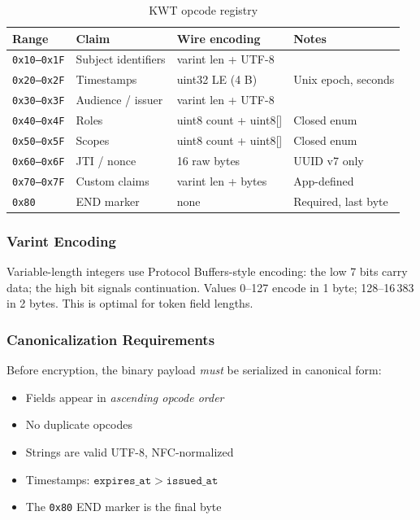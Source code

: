 \documentclass[11pt, letterpaper]{article}
\begin{document}
\begin{table}[H]
\centering
\caption{KWT opcode registry}
\small
\begin{tabularx}{\linewidth}{C{2.2cm} L{2.6cm} L{2.8cm} X}
\toprule
{}
\color{white}\textbf{Range} &
\color{white}\textbf{Claim} &
\color{white}\textbf{Wire encoding} &
\color{white}\textbf{Notes} \\
\midrule
\texttt{0x10--0x1F} & Subject identifiers & varint len + UTF-8 & \\
\texttt{0x20--0x2F} & Timestamps & uint32 LE (4 B) & Unix epoch, seconds \\
\texttt{0x30--0x3F} & Audience / issuer & varint len + UTF-8 & \\
\texttt{0x40--0x4F} & Roles & uint8 count + uint8[] & Closed enum \\
\texttt{0x50--0x5F} & Scopes & uint8 count + uint8[] & Closed enum \\
\texttt{0x60--0x6F} & JTI / nonce & 16 raw bytes & UUID v7 only \\
\texttt{0x70--0x7F} & Custom claims & varint len + bytes & App-defined \\
\texttt{0x80}       & END marker & none & Required, last byte \\
\bottomrule
\end{tabularx}
\end{table}

\subsubsection{Varint Encoding}

Variable-length integers use Protocol Buffers-style encoding: the low 7 bits
carry data; the high bit signals continuation. Values 0--127 encode in 1 byte;
128--16\,383 in 2 bytes. This is optimal for token field lengths.

\subsubsection{Canonicalization Requirements}

Before encryption, the binary payload \emph{must} be serialized in canonical
form:

\begin{itemize}[noitemsep]
  \item Fields appear in \emph{ascending opcode order}
  \item No duplicate opcodes
  \item Strings are valid UTF-8, NFC-normalized
  \item Timestamps: $\mathtt{expires\_at} > \mathtt{issued\_at}$
  \item The \texttt{0x80} END marker is the final byte
\end{itemize}
\end{document}
